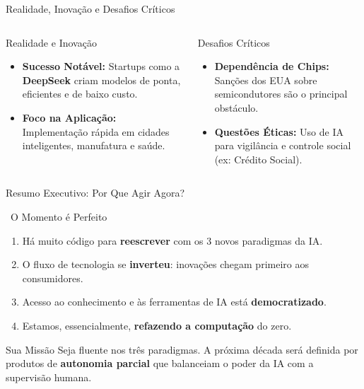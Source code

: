 \documentclass{beamer}
\begin{document}
\begin{frame}{Realidade, Inovação e Desafios Críticos}
    \begin{columns}[T]
        \begin{column}{0.5\textwidth}
            \begin{exampleblock}{Realidade e Inovação}
                \begin{itemize}
                    \item \textbf{Sucesso Notável:} Startups como a \textbf{DeepSeek} criam modelos de ponta, eficientes e de baixo custo.
                    \item \textbf{Foco na Aplicação:} Implementação rápida em cidades inteligentes, manufatura e saúde.
                \end{itemize}
            \end{exampleblock}
        \end{column}
        
        \begin{column}{0.5\textwidth}
            \begin{alertblock}{Desafios Críticos}
                \begin{itemize}
                    \item \textbf{Dependência de Chips:} Sanções dos EUA sobre semicondutores são o principal obstáculo.
                    \item \textbf{Questões Éticas:} Uso de IA para vigilância e controle social (ex: Crédito Social).
                \end{itemize}
            \end{alertblock}
        \end{column}
    \end{columns}
\end{frame}

\begin{frame}{Resumo Executivo: Por Que Agir Agora?}
    \begin{block}{\faRocket\, O Momento é Perfeito}
        \begin{enumerate}
            \item Há muito código para \textbf{reescrever} com os 3 novos paradigmas da IA.
            \item O fluxo de tecnologia se \textbf{inverteu}: inovações chegam primeiro aos consumidores.
            \item Acesso ao conhecimento e às ferramentas de IA está \textbf{democratizado}.
            \item Estamos, essencialmente, \textbf{refazendo a computação} do zero.
        \end{enumerate}
    \end{block}
    
    \begin{alertblock}{Sua Missão}
        Seja fluente nos três paradigmas. A próxima década será definida por produtos de \textbf{autonomia parcial} que balanceiam o poder da IA com a supervisão humana.
    \end{alertblock}
\end{frame}
\end{document}
